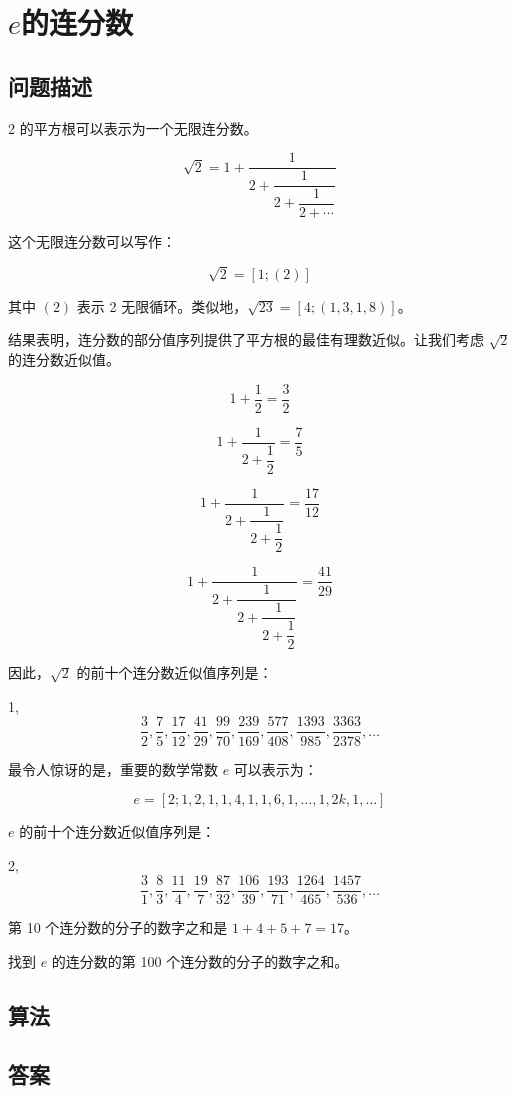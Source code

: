 \section[\lower{e}的连分数]{$e$的连分数}
\subsection{问题描述}
\begin{tcolorbox}[breakable]

	2 的平方根可以表示为一个无限连分数。

	\[ \sqrt{2} = 1 + \dfrac{1}{2 + \dfrac{1}{2 + \dfrac{1}{2 + \cdots}}} \]

	这个无限连分数可以写作：

	\[ \sqrt{2} = [1; (2)] \]

	其中 \((2)\) 表示 2 无限循环。类似地，\(\sqrt{23} = [4; (1, 3, 1, 8)]\)。

	结果表明，连分数的部分值序列提供了平方根的最佳有理数近似。让我们考虑 \(\sqrt{2}\) 的连分数近似值。

	\[ 1 + \dfrac{1}{2} = \dfrac{3}{2} \]

	\[ 1 + \dfrac{1}{2 + \dfrac{1}{2}} = \dfrac{7}{5} \]

	\[ 1 + \dfrac{1}{2 + \dfrac{1}{2 + \dfrac{1}{2}}} = \dfrac{17}{12} \]

	\[ 1 + \dfrac{1}{2 + \dfrac{1}{2 + \dfrac{1}{2 + \dfrac{1}{2}}}} = \dfrac{41}{29} \]

	因此，\(\sqrt{2}\) 的前十个连分数近似值序列是：

	1,
	\[ \dfrac{3}{2}, \dfrac{7}{5}, \dfrac{17}{12}, \dfrac{41}{29}, \dfrac{99}{70}, \dfrac{239}{169}, \dfrac{577}{408}, \dfrac{1393}{985}, \dfrac{3363}{2378}, \ldots \]

	最令人惊讶的是，重要的数学常数 \( e \) 可以表示为：

	\[ e = [2; 1, 2, 1, 1, 4, 1, 1, 6, 1, \ldots, 1, 2k, 1, \ldots] \]

	\( e \) 的前十个连分数近似值序列是：

	2,
	\[ \dfrac{3}{1}, \dfrac{8}{3}, \dfrac{11}{4}, \dfrac{19}{7}, \dfrac{87}{32}, \dfrac{106}{39}, \dfrac{193}{71}, \dfrac{1264}{465}, \dfrac{1457}{536}, \ldots \]

	第 10 个连分数的分子的数字之和是 \(1 + 4 + 5 + 7 = 17\)。

	找到 \( e \) 的连分数的第 100 个连分数的分子的数字之和。
\end{tcolorbox}

\subsection{算法}

\subsection{答案}
